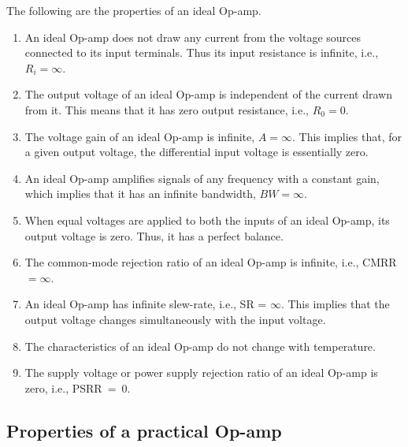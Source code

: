 The following are the properties of an ideal Op-amp.
\begin{enumerate}
\item An ideal Op-amp does not draw any current from the voltage sources connected to its input terminals. Thus its input resistance is infinite, i.e., $R_{i}=\infty$.

\item The output voltage of an ideal Op-amp is independent of the current drawn from it. This means that it has zero output resistance, i.e., $R_{0}=0$.

\item The voltage gain of an ideal Op-amp is infinite, $A=\infty$. This implies that, for a given output voltage, the differential input voltage is essentially zero.

\item An ideal Op-amp amplifies signals of any frequency with a constant gain, which implies that it has an infinite bandwidth, $BW=\infty$.

\item When equal voltages are applied to both the inputs of an ideal Op-amp, its output voltage is zero. Thus, it has a perfect balance.

\item The common-mode rejection ratio of an ideal Op-amp is infinite, i.e., CMRR $=\infty$.

\item An ideal Op-amp has infinite slew-rate, i.e., SR = $\infty$. This implies that the output voltage changes simultaneously with the input voltage.

\item The characteristics of an ideal Op-amp do not change with temperature.

\item The supply voltage or power supply rejection ratio of an ideal Op-amp is zero, i.e., PSRR~=~0.
\end{enumerate}

\subsection{Properties of a practical Op-amp}\label{sec5.1.4}


